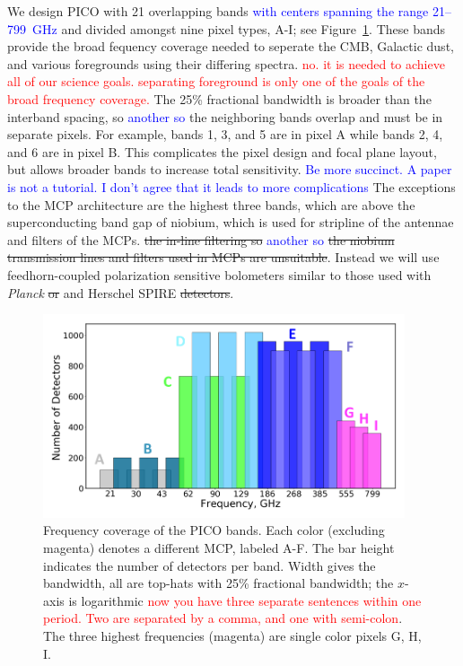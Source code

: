 \documentclass[]{spie}  %
\newcommand{\comr}[1]{\textcolor{red}{#1}}
\newcommand{\comb}[1]{\textcolor{blue}{#1}}
\begin{document}
We design PICO with 21 overlapping bands \comb{with centers spanning the range 21--799~GHz} and divided amongst 
nine pixel types, A-I; see Figure~\ref{fig:bands}. 
These bands provide the broad fequency coverage needed to seperate the CMB, Galactic dust, and various foregrounds using their differing spectra.  \comr{no. it is needed to achieve all of our science goals. separating foreground is only one of the goals
of the broad frequency coverage.}
The 25\% fractional bandwidth is broader than the interband spacing, so \comb{another so} the neighboring bands 
overlap and must be in separate pixels.  
For example, bands 1, 3, and 5 are in pixel A while bands 2, 4, and 6 are in pixel B.  This 
complicates the pixel design and focal plane layout, but allows broader bands to increase total sensitivity.  
\comb{Be more succinct. A paper is not a tutorial. I don't agree that it leads to more complications}
The exceptions to the MCP architecture are the highest three bands, which  are above the superconducting 
band gap of niobium, which is used for stripline of the antennae and filters of the MCPs. \sout{the in-line filtering  so} \comb{another so}
\sout{the niobium transmission lines and filters used in MCPs are unsuitable}.  Instead we will use feedhorn-coupled polarization sensitive bolometers similar to those used with \textit{Planck}\cite{planck2010_hfi} \sout{or} and Herschel SPIRE\cite{spire2010} \sout{detectors}.  

\begin{figure} [ht]
\begin{center}
\includegraphics[height=6cm]{bands_label.png}
\end{center}
\caption { \label{fig:bands} 
Frequency coverage of the PICO bands. Each color (excluding magenta) denotes a different MCP, labeled A-F. The bar height 
indicates the number of detectors per band.  Width gives the bandwidth, all are top-hats with 
25\% fractional bandwidth; the $x$-axis is logarithmic \comr{now you have three separate sentences within one period. Two 
are separated by a comma, and one with semi-colon}.  The three highest frequencies (magenta) are single color pixels G, H, I.}
\end{figure} 
\end{document}
